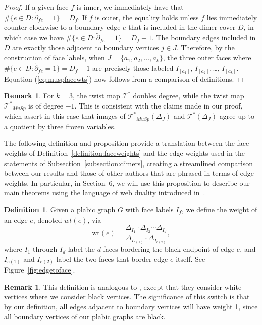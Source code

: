 \documentclass[11pt]{article}
\theoremstyle{definition}
\newtheorem{defi}[theo]{Definition}
\newtheorem{rema}[theo]{Remark}
\numberwithin{equation}{section}
\def\T {{\mathscr{T}^*}}
\numberwithin{equation}{section}
\begin{document}
\begin{proof}
If a given face $f$ is inner, we immediately have that $\#\{e \in D : \tilde{\partial}_{fe} = 1\} = D_f$. If $f$ is outer, the equality holds unless $f$ lies immediately counter-clockwise to a boundary edge $e$ that is included in the dimer cover $D$, in which case we have $\#\{e \in D : \tilde{\partial}_{fe} = 1\} = D_f+1$. The boundary edges included in $D$ are exactly those adjacent to boundary vertices $j \in J$. Therefore, by the construction of face labels, when $J = \{a_1,a_2,\dots, a_k\}$, the three outer faces where $\#\{e \in D : \tilde{\partial}_{fe} = 1\} = D_f + 1$ are precisely those labeled $I_{[a_1]}$, $I_{[a_2]},$\dots, $I_{[a_k]}$. Equation (\ref{eq:muspfacewts}) now follows from a comparison of definitions.
\end{proof}


\begin{rema}
\label{rem:twistdegrees}
For $k=3$, the twist map $\T$ doubles degree, while the twist map $\T_{MuSp}$ is of degree $-1$. This is consistent with the claims made in our proof, which assert in this case that images of $\T_{MuSp}(\Delta_J)$ and $\T(\Delta_J)$ agree up to a quotient by three frozen variables.
\end{rema}

The following definition and proposition provide a translation between the face weights of Definition~\ref{definition:faceweights} and the edge weights used in the statements of Subsection~\ref{subsection:dimers}, creating a streamlined comparison between our results and those of other authors that are phrased in terms of edge weights. In particular, in Section~6, we will use this proposition to describe our main theorems using the language of web duality introduced in~\cite{fll2019}.
\begin{defi}\label{def:MaScEdgeWeights}
Given a plabic graph $G$ with face labels $I_f$, we define the weight of an edge $e$, denoted $wt(e)$, via
$$\text{wt}(e) = \frac{\Delta_{I_1}\cdot \Delta_{I_2} \cdots \Delta_{I_d}}{\Delta_{{I_{e(1)}}}\cdot \Delta_{I_{e(2)}}},$$
where $I_1$ through $I_d$ label the $d$ faces bordering the black endpoint of edge $e$, and $I_{e(1)}$ and $I_{e(2)}$ label the two faces that border edge $e$ itself. See Figure~\ref{fig:edgetoface}.
\end{defi}
\begin{rema}
This definition is analogous to \cite[Definition 7.1]{marshscott2016}, except that they consider white vertices where we consider black vertices. The significance of this switch is that by our definition, all edges adjacent to boundary vertices will have weight 1, since all boundary vertices of our plabic graphs are black.
\end{rema}
\end{document}

